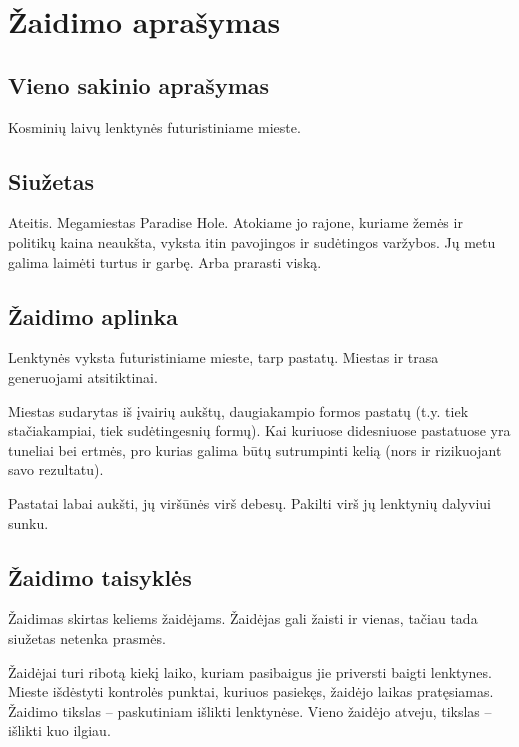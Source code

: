 \section{Žaidimo aprašymas}
\subsection{Vieno sakinio aprašymas}

Kosminių laivų lenktynės futuristiniame mieste.

\subsection{Siužetas}

Ateitis.
Megamiestas Paradise Hole.
Atokiame jo rajone, kuriame žemės ir politikų kaina neaukšta, vyksta itin pavojingos ir sudėtingos varžybos.
Jų metu galima laimėti turtus ir garbę.
Arba prarasti viską.

\subsection{Žaidimo aplinka}


Lenktynės vyksta futuristiniame mieste, tarp pastatų.
Miestas ir trasa generuojami atsitiktinai.

Miestas sudarytas iš įvairių aukštų, daugiakampio formos pastatų (t.y. tiek stačiakampiai, tiek sudėtingesnių formų).
Kai kuriuose didesniuose pastatuose yra tuneliai bei ertmės, pro kurias galima būtų sutrumpinti kelią (nors ir rizikuojant savo rezultatu).

Pastatai labai aukšti, jų viršūnės virš debesų.
Pakilti virš jų lenktynių dalyviui sunku.

\subsection{Žaidimo taisyklės}


Žaidimas skirtas keliems žaidėjams.
Žaidėjas gali žaisti ir vienas, tačiau tada siužetas netenka prasmės.

Žaidėjai turi ribotą kiekį laiko, kuriam pasibaigus jie priversti baigti lenktynes.
Mieste išdėstyti kontrolės punktai, kuriuos pasiekęs, žaidėjo laikas pratęsiamas.
Žaidimo tikslas -- paskutiniam išlikti lenktynėse.
Vieno žaidėjo atveju, tikslas -- išlikti kuo ilgiau.

